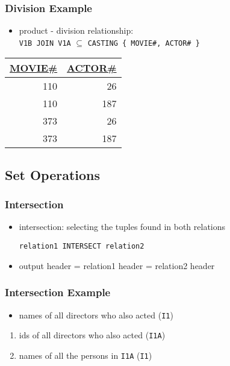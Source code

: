 \documentclass[dvipsnames]{beamer}
\theoremstyle{plain}
\begin{document}
\begin{frame}[fragile]
  \frametitle{Division Example}

  \begin{itemize}
    \item product - division relationship:\\
      \lstinline!V1B JOIN V1A! $\subseteq$
      \lstinline!CASTING { MOVIE#, ACTOR# }!
  \end{itemize}

  \begin{tiny}
  \begin{table}
    \begin{tabular}{|r|r|}\hline
\underline{MOVIE\#} & \underline{ACTOR\#}\\[2pt]\hline\hline
                110 &                  26\\\hline
                110 &                 187\\\hline
                373 &                  26\\\hline
                373 &                 187\\\hline
    \end{tabular}
  \end{table}
  \end{tiny}
\end{frame}

\subsection{Set Operations}

\begin{frame}[fragile]
  \frametitle{Intersection}

  \begin{itemize}
    \item \alert{intersection}: selecting the tuples found in both relations
    \begin{lstlisting}
relation1 INTERSECT relation2
    \end{lstlisting}

    \medskip
    \item output header = relation1 header = relation2 header
  \end{itemize}
\end{frame}

\begin{frame}
  \frametitle{Intersection Example}

  \begin{itemize}
    \item names of all directors who also acted (\texttt{I1})
  \end{itemize}

  \pause
  \begin{enumerate}
    \item ids of all directors who also acted (\texttt{I1A})
    \item names of all the persons in \texttt{I1A} (\texttt{I1})
  \end{enumerate}
\end{frame}
\end{document}
